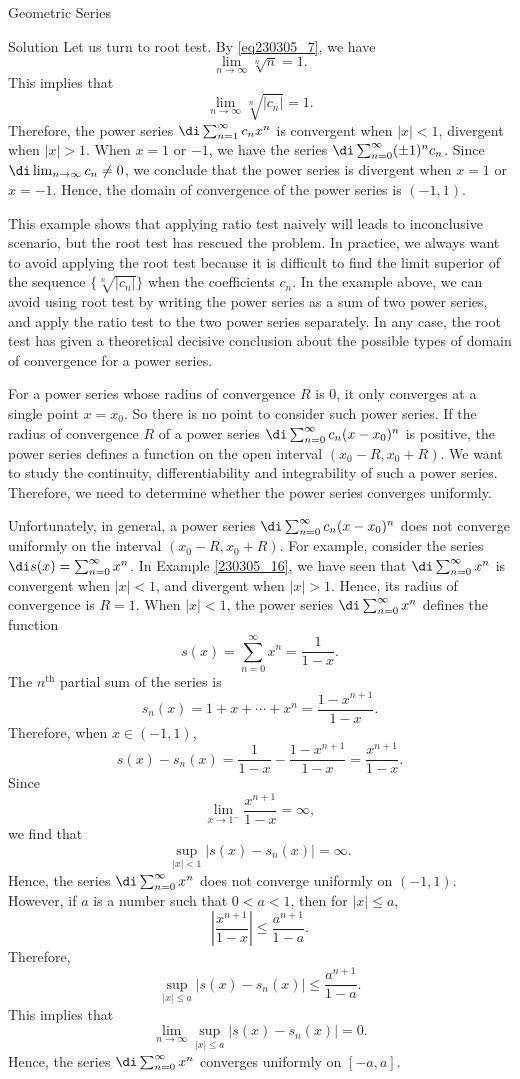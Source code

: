 \begin{example}[label=230305_16]{Geometric Series}
\begin{example}[label=230304_9]{}
\begin{solution}{Solution}
Let us turn to root test.
By \eqref{eq230305_7}, we have
\[\lim_{n\to\infty}\sqrt[n]{n}=1.\]  This implies that
\[\lim_{n\to\infty}\sqrt[n]{|c_n|}=1.\]
Therefore, the power series $\di\sum_{n=1}^{\infty}c_nx^n$ is convergent when $|x|<1$, divergent when $|x|>1$. When $x=1$ or $-1$, we have the series
$\di \sum_{n=0}^{\infty}(\pm 1)^nc_n$. Since $\di\lim_{n\to\infty}c_n\neq 0$, we conclude that the power series is divergent when $x=1$ or $x=-1$.
Hence, the domain of convergence of the power series is $(-1,1)$.
\end{solution}
This example shows that  applying ratio test naively will leads to inconclusive scenario, but the root test has rescued the problem. In practice, we always want to avoid applying the root test  because it is difficult to find the limit superior of the sequence $\{\sqrt[n]{|c_n|}\}$ when the coefficients $c_n$. In the example above, we can avoid using root test by writing the power series as a sum of two power series, and apply the ratio test to the two power series separately.  In any case, the root test has given a theoretical  decisive conclusion about the possible types of domain of convergence for a power series.  

 
 For a power series whose radius of convergence $R$ is 0, it only converges at a single point $x=x_0$. So there is no point to consider such power series.
If the radius of convergence $R$ of a power series   $\di \sum_{n=0}^{\infty}c_n(x-x_0)^n$  is positive, the power series defines a function on the open interval 
$(x_0-R, x_0+R)$. We want to study the continuity, differentiability and integrability of such a power series. Therefore, we need to determine whether the power series converges uniformly.

Unfortunately, in general, a power series $\di\sum_{n=0}^{\infty}c_n(x-x_0)^n$  does not converge uniformly on the interval $(x_0-R, x_0+R)$.   For example, consider the  series $\di s(x)=\sum_{n=0}^{\infty}x^n$. In Example \ref{230305_16}, we have seen that   $\di\sum_{n=0}^{\infty} x^n$ is convergent when $|x|<1$, and divergent when $|x|>1$. Hence, its radius of convergence is $R=1$. When $|x|<1$, the power series $\di\sum_{n=0}^{\infty} x^n$ defines the function
\[s(x)=\sum_{n=0}^{\infty} x^n=\frac{1}{1-x}.\] The $n^{\text{th}}$ partial sum of the series is
\[s_n(x)=1+x+\cdots+x^n=\frac{1-x^{n+1}}{1-x}.\]
Therefore, when $x\in (-1,1)$,
\[s(x)-s_n(x)=\frac{1}{1-x}-\frac{1-x^{n+1}}{1-x}=\frac{x^{n+1}}{1-x}.\]Since
\[\lim_{x\to 1^-}\frac{x^{n+1}}{1-x}=\infty,\]we find  that
\[\sup_{|x|<1}|s(x)-s_n(x)|=\infty.\]
Hence, the series $\di\sum_{n=0}^{\infty}x^n$ does not converge uniformly on $(-1,1)$. However, if $a$ is a number such that $0<a<1$, then for $|x|\leq a$,
\[\left|\frac{x^{n+1}}{1-x}\right|\leq \frac{a^{n+1}}{1-a}.\]
Therefore,
\[ \sup_{|x|\leq a}|s(x)-s_n(x)|\leq\frac{a^{n+1}}{1-a}.\]
This implies that
\[\lim_{n\to\infty}\sup_{|x|\leq a}|s(x)-s_n(x)|=0.\]
Hence, the series $\di\sum_{n=0}^{\infty}x^n$  converges uniformly on $[-a,a]$.


\end{example}
\end{example}
